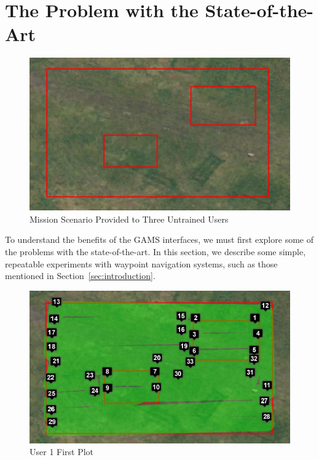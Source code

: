 \documentclass{sig-alternate-ipsn13}
\begin{document}
\section{The Problem with the State-of-the-Art}
\label{sec:waypoints}

\begin{figure}[htb]
  \centering
  \includegraphics[scale=0.4]{guiding_scenario}
  \caption{Mission Scenario Provided to Three Untrained Users}
  \label{fig:guiding}
\end{figure}

To understand the benefits of the GAMS interfaces, we must first explore some
of the problems with the state-of-the-art. In this section, we describe some
simple, repeatable experiments with waypoint navigation systems, such as
those mentioned in Section~\ref{sec:introduction}.


\begin{figure}[h]
  \centering
  \includegraphics[scale=0.4]{user_waypoints_1}
  \caption{User 1 First Plot}
  \label{fig:user1_1}
\end{figure}
\end{document}
